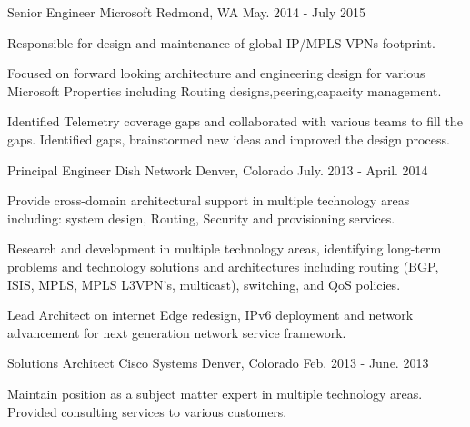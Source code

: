 \begin{cventries}
  \cventry
    {Senior Engineer} %
    {Microsoft} %
    {Redmond, WA} %
    {May. 2014 - July 2015} %
    {
      \begin{cvitems} %
        \item {Responsible for design and maintenance of global IP/MPLS VPNs footprint.}
        \item {Focused on forward looking architecture and engineering design for various Microsoft Properties including Routing designs,peering,capacity management.}
        \item {Identified Telemetry coverage gaps and collaborated with various teams to fill the gaps. Identified gaps, brainstormed new ideas and improved the design process. }
      \end{cvitems}
    }

  \cventry
    {Principal Engineer} %
    {Dish Network} %
    {Denver, Colorado} %
    {July. 2013 - April. 2014} %
    {
      \begin{cvitems} %
        \item {Provide cross-domain architectural support in multiple technology areas including: system design, Routing, Security and provisioning services. }
        \item { Research and development in multiple technology areas, identifying long-term problems and technology solutions and architectures including routing (BGP, ISIS, MPLS, MPLS L3VPN’s, multicast), switching, and QoS policies.}
        \item {Lead Architect on internet Edge redesign, IPv6 deployment and network advancement for next generation network service framework.}
      \end{cvitems}
    }
  \cventry
    {Solutions Architect} %
    {Cisco Systems} %
    {Denver, Colorado} %
    {Feb. 2013 - June. 2013} %
    {
      \begin{cvitems} %
        \item { Maintain position as a subject matter expert in multiple technology areas. Provided consulting services to various customers.}
      \end{cvitems}
    }


\end{cventries}
